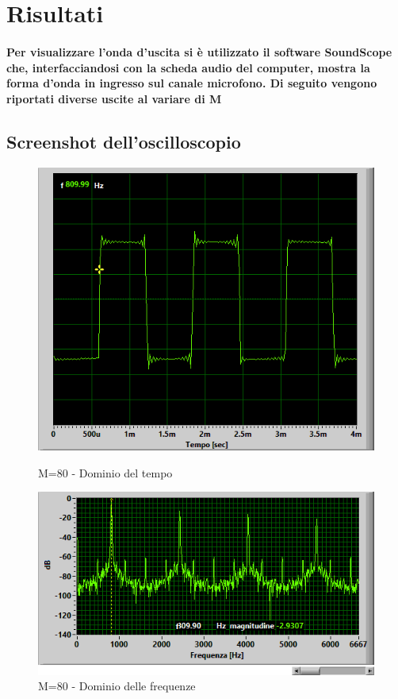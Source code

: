 \documentclass[a4paper]{article}
\begin{document}
\section{Risultati}
\paragraph{Per visualizzare l'onda d'uscita si è utilizzato il software SoundScope che, interfacciandosi con la scheda audio del computer, mostra la forma d'onda in ingresso sul canale microfono. Di seguito vengono riportati diverse uscite al variare di M}
\subsection{Screenshot dell'oscilloscopio}

\begin{figure}[H]
   \begin{minipage}{0.48\textwidth}
     \centering
     \includegraphics[width=1\linewidth]{m80}
     \caption{M=80 - Dominio del tempo}\label{Fig:Data1}
   \end{minipage}\hfill
   \begin{minipage}{0.48\textwidth}
     \centering
     \includegraphics[width=1\linewidth]{m80f}
     \caption{M=80 - Dominio delle frequenze}\label{Fig:Data2}
   \end{minipage}
\end{figure}
\end{document}

